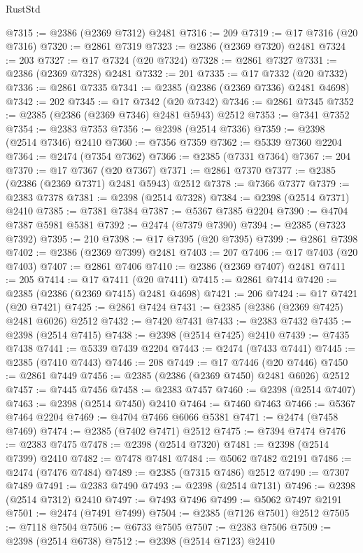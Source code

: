 \begin{lexlean}{RustStd}
\begin{coremodule}
{\begin{coremodule}
{{{{{{{{{{{{{{{{{{{{{{{{{{{{{{{{{{{{{{{{{{{{{{{{{{@7315 := @2386 (@2369 @7312) @2481
@7316 := 209
@7319 := @17 @7316 (@20 @7316)
@7320 := @2861 @7319
@7323 := @2386 (@2369 @7320) @2481
@7324 := 203
@7327 := @17 @7324 (@20 @7324)
@7328 := @2861 @7327
@7331 := @2386 (@2369 @7328) @2481
@7332 := 201
@7335 := @17 @7332 (@20 @7332)
@7336 := @2861 @7335
@7341 := @2385 (@2386 (@2369 @7336) @2481 @4698)
@7342 := 202
@7345 := @17 @7342 (@20 @7342)
@7346 := @2861 @7345
@7352 := @2385 (@2386 (@2369 @7346) @2481 @5943) @2512
@7353 := @7341 @7352
@7354 := @2383 @7353
@7356 := @2398 (@2514 @7336)
@7359 := @2398 (@2514 @7346) @2410
@7360 := @7356 @7359
@7362 := @5339 @7360 @2204
@7364 := @2474 (@7354 @7362)
@7366 := @2385 (@7331 @7364)
@7367 := 204
@7370 := @17 @7367 (@20 @7367)
@7371 := @2861 @7370
@7377 := @2385 (@2386 (@2369 @7371) @2481 @5943) @2512
@7378 := @7366 @7377
@7379 := @2383 @7378
@7381 := @2398 (@2514 @7328)
@7384 := @2398 (@2514 @7371) @2410
@7385 := @7381 @7384
@7387 := @5367 @7385 @2204
@7390 := @4704 @7387 @5981 @5381
@7392 := @2474 (@7379 @7390)
@7394 := @2385 (@7323 @7392)
@7395 := 210
@7398 := @17 @7395 (@20 @7395)
@7399 := @2861 @7398
@7402 := @2386 (@2369 @7399) @2481
@7403 := 207
@7406 := @17 @7403 (@20 @7403)
@7407 := @2861 @7406
@7410 := @2386 (@2369 @7407) @2481
@7411 := 205
@7414 := @17 @7411 (@20 @7411)
@7415 := @2861 @7414
@7420 := @2385 (@2386 (@2369 @7415) @2481 @4698)
@7421 := 206
@7424 := @17 @7421 (@20 @7421)
@7425 := @2861 @7424
@7431 := @2385 (@2386 (@2369 @7425) @2481 @6026) @2512
@7432 := @7420 @7431
@7433 := @2383 @7432
@7435 := @2398 (@2514 @7415)
@7438 := @2398 (@2514 @7425) @2410
@7439 := @7435 @7438
@7441 := @5339 @7439 @2204
@7443 := @2474 (@7433 @7441)
@7445 := @2385 (@7410 @7443)
@7446 := 208
@7449 := @17 @7446 (@20 @7446)
@7450 := @2861 @7449
@7456 := @2385 (@2386 (@2369 @7450) @2481 @6026) @2512
@7457 := @7445 @7456
@7458 := @2383 @7457
@7460 := @2398 (@2514 @7407)
@7463 := @2398 (@2514 @7450) @2410
@7464 := @7460 @7463
@7466 := @5367 @7464 @2204
@7469 := @4704 @7466 @6066 @5381
@7471 := @2474 (@7458 @7469)
@7474 := @2385 (@7402 @7471) @2512
@7475 := @7394 @7474
@7476 := @2383 @7475
@7478 := @2398 (@2514 @7320)
@7481 := @2398 (@2514 @7399) @2410
@7482 := @7478 @7481
@7484 := @5062 @7482 @2191
@7486 := @2474 (@7476 @7484)
@7489 := @2385 (@7315 @7486) @2512
@7490 := @7307 @7489
@7491 := @2383 @7490
@7493 := @2398 (@2514 @7131)
@7496 := @2398 (@2514 @7312) @2410
@7497 := @7493 @7496
@7499 := @5062 @7497 @2191
@7501 := @2474 (@7491 @7499)
@7504 := @2385 (@7126 @7501) @2512
@7505 := @7118 @7504
@7506 := @6733 @7505
@7507 := @2383 @7506
@7509 := @2398 (@2514 @6738)
@7512 := @2398 (@2514 @7123) @2410
}}}}}}}}}}}}}}}}}}}}}}}}}}}}}}}}}}}}}}}}}}}}}}}}}}
\end{coremodule}}
\end{coremodule}
\end{lexlean}
